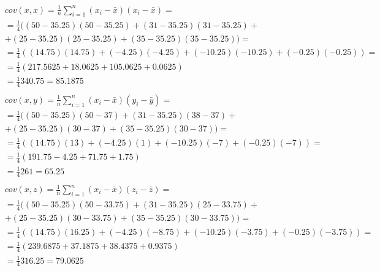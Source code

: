 \documentclass[a4paper]{article}
\begin{document}
	\begin{align*}
		&cov(x,x)=\frac{1}{n}\sum_{i=1}^{n}(x_i-\bar{x})(x_i-\bar{x})=
		\\
		&=\frac{1}{4}((50-35.25)(50-35.25)+(31-35.25)(31-35.25)+
		\\
		&+(25-35.25)(25-35.25)+(35-35.25)(35-35.25))=
		\\
		&=\frac{1}{4}((14.75)(14.75)+(-4.25)(-4.25)+
		(-10.25)(-10.25)+(-0.25)(-0.25))=
		\\
		&=\frac{1}{4}(217.5625+18.0625+105.0625+0.0625)
		\\
		&=\frac{1}{4}340.75=85.1875
		\\
		\\
		&cov(x,y)=\frac{1}{n}\sum_{i=1}^{n}(x_i-\bar{x})(y_i-\bar{y})=
		\\
		&=\frac{1}{4}((50-35.25)(50-37)+(31-35.25)(38-37)+
		\\
		&+(25-35.25)(30-37)+(35-35.25)(30-37))=
		\\
		&=\frac{1}{4}((14.75)(13)+(-4.25)(1)+
		(-10.25)(-7)+(-0.25)(-7))=
		\\
		&=\frac{1}{4}(191.75-4.25+71.75+1.75)
		\\
		&=\frac{1}{4}261=65.25
		\\
		\\
		&cov(x,z)=\frac{1}{n}\sum_{i=1}^{n}(x_i-\bar{x})(z_i-\bar{z})=
		\\
		&=\frac{1}{4}((50-35.25)(50-33.75)+(31-35.25)(25-33.75)+
		\\
		&+(25-35.25)(30-33.75)+(35-35.25)(30-33.75))=
		\\
		&=\frac{1}{4}((14.75)(16.25)+(-4.25)(-8.75)+
		(-10.25)(-3.75)+(-0.25)(-3.75))=
		\\
		&=\frac{1}{4}(239.6875+37.1875+38.4375+0.9375)
		\\
		&=\frac{1}{4}316.25=79.0625
	\end{align*}
\end{document}
